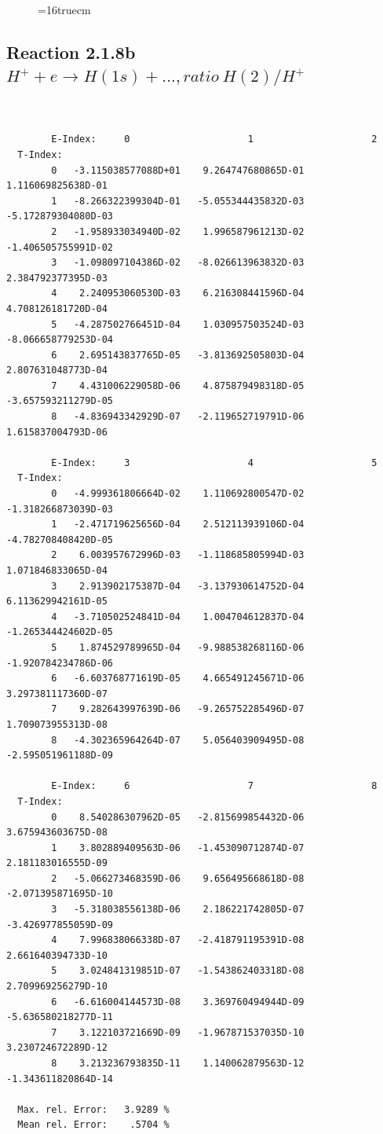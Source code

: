 \documentclass[12pt,dvips]{article}
\begin{document}
\begin{figure} \label{2.1.8ra}
\epsfxsize=16truecm
\end{figure}
\newpage



\subsection{
Reaction 2.1.8b  $H^+ + e \rightarrow H(1s) + ...,  ratio ~ H(2)/H^+$
}

\begin{small}\begin{verbatim}


        E-Index:     0                     1                     2
  T-Index:
        0   -3.115038577088D+01    9.264747680865D-01    1.116069825638D-01
        1   -8.266322399304D-01   -5.055344435832D-03   -5.172879304080D-03
        2   -1.958933034940D-02    1.996587961213D-02   -1.406505755991D-02
        3   -1.098097104386D-02   -8.026613963832D-03    2.384792377395D-03
        4    2.240953060530D-03    6.216308441596D-04    4.708126181720D-04
        5   -4.287502766451D-04    1.030957503524D-03   -8.066658779253D-04
        6    2.695143837765D-05   -3.813692505803D-04    2.807631048773D-04
        7    4.431006229058D-06    4.875879498318D-05   -3.657593211279D-05
        8   -4.836943342929D-07   -2.119652719791D-06    1.615837004793D-06

        E-Index:     3                     4                     5
  T-Index:
        0   -4.999361806664D-02    1.110692800547D-02   -1.318266873039D-03
        1   -2.471719625656D-04    2.512113939106D-04   -4.782708408420D-05
        2    6.003957672996D-03   -1.118685805994D-03    1.071846833065D-04
        3    2.913902175387D-04   -3.137930614752D-04    6.113629942161D-05
        4   -3.710502524841D-04    1.004704612837D-04   -1.265344424602D-05
        5    1.874529789965D-04   -9.988538268116D-06   -1.920784234786D-06
        6   -6.603768771619D-05    4.665491245671D-06    3.297381117360D-07
        7    9.282643997639D-06   -9.265752285496D-07    1.709073955313D-08
        8   -4.302365964264D-07    5.056403909495D-08   -2.595051961188D-09

        E-Index:     6                     7                     8
  T-Index:
        0    8.540286307962D-05   -2.815699854432D-06    3.675943603675D-08
        1    3.802889409563D-06   -1.453090712874D-07    2.181183016555D-09
        2   -5.066273468359D-06    9.656495668618D-08   -2.071395871695D-10
        3   -5.318038556138D-06    2.186221742805D-07   -3.426977855059D-09
        4    7.996838066338D-07   -2.418791195391D-08    2.661640394733D-10
        5    3.024841319851D-07   -1.543862403318D-08    2.709969256279D-10
        6   -6.616004144573D-08    3.369760494944D-09   -5.636580218277D-11
        7    3.122103721669D-09   -1.967871537035D-10    3.230724672289D-12
        8    3.213236793835D-11    1.140062879563D-12   -1.343611820864D-14

  Max. rel. Error:   3.9289 %
  Mean rel. Error:    .5704 %

\end{verbatim}\end{small}
\end{document}

